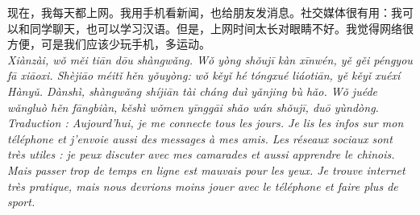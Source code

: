 \documentclass[11pt]{article}
\begin{document}
\begin{corrige}
现在，我每天都上网。我用手机看新闻，也给朋友发消息。社交媒体很有用：我可以和同学聊天，也可以学习汉语。但是，上网时间太长对眼睛不好。我觉得网络很方便，可是我们应该少玩手机，多运动。\\
\emph{Xiànzài, wǒ měi tiān dōu shàngwǎng. Wǒ yòng shǒujī kàn xīnwén, yě gěi péngyou fā xiāoxi. Shèjiāo méitǐ hěn yǒuyòng: wǒ kěyǐ hé tóngxué liáotiān, yě kěyǐ xuéxí Hànyǔ. Dànshì, shàngwǎng shíjiān tài cháng duì yǎnjing bù hǎo. Wǒ juéde wǎngluò hěn fāngbiàn, kěshì wǒmen yīnggāi shǎo wán shǒujī, duō yùndòng.}\\
\textit{Traduction : Aujourd'hui, je me connecte tous les jours. Je lis les infos sur mon téléphone et j'envoie aussi des messages à mes amis. Les réseaux sociaux sont très utiles : je peux discuter avec mes camarades et aussi apprendre le chinois. Mais passer trop de temps en ligne est mauvais pour les yeux. Je trouve internet très pratique, mais nous devrions moins jouer avec le téléphone et faire plus de sport.}
\end{corrige}
\end{document}
